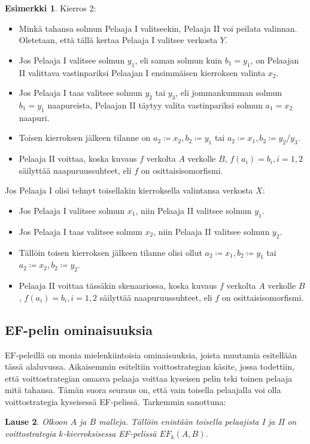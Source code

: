 \documentclass[finnish]{tktltiki2}
\newtheorem{lau}{Lause}
\theoremstyle{definition}
\newtheorem{esim}[lau]{Esimerkki}
\theoremstyle{remark}
\begin{document}
\begin{esim}
Kierros 2:
\begin{itemize}
  \item Minkä tahansa solmun Pelaaja I valitseekin, Pelaaja II voi peilata valinnan. Oletetaan, että tällä kertaa Pelaaja I valitsee verkosta $Y$.
  \item Jos Pelaaja I valitsee solmun $y_1$, eli saman solmun kuin $b_1 = y_1$, on Pelaajan II valittava vastinpariksi Pelaajan I ensimmäisen kierroksen valinta $x_2$.
  \item Jos Pelaaja I taas valitsee solmun $y_2$ tai $y_3$, eli jommankumman solmun $b_1 = y_1$ naapureista, Pelaajan II täytyy valita vastinpariksi solmun $a_1 = x_2$ naapuri.
  \item Toisen kierroksen jälkeen tilanne on $a_2 \coloneqq x_2, b_2 \coloneqq y_1$ tai $a_2 \coloneqq x_1, b_2 \coloneqq y_2/y_3$.
  \item Pelaaja II voittaa, koska kuvaus $f$ verkolta $A$ verkolle $B$, $f(a_i) = b_i, i = 1, 2$ säilyttää naapuruussuhteet, eli $f$ on osittaisisomorfismi.
\end{itemize}

Jos Pelaaja I olisi tehnyt toisellakin kierroksella valintansa verkosta $X$:
\begin{itemize}
\item Jos Pelaaja I valitsee solmun $x_1$, niin Pelaaja II valitsee solmun $y_1$.
\item Jos Pelaaja I taas valitsee solmun $x_2$, niin Pelaaja II valitsee solmun $y_2$.
\item Tällöin toisen kierroksen jälkeen tilanne olisi ollut $a_2 \coloneqq x_1, b_2 \coloneqq y_1$ tai $a_2 \coloneqq x_2, b_2 \coloneqq y_2$.
\item Pelaaja II voittaa tässäkin skenaariossa, koska kuvaus $f$ verkolta $A$ verkolle $B$, $f(a_i) = b_i, i = 1, 2$ säilyttää naapuruussuhteet, eli $f$ on osittaisisomorfismi.
\end{itemize}
\end{esim}

\subsection{EF-pelin ominaisuuksia}
EF-peleillä on monia mielenkiintoisia ominaisuuksia, joista muutamia esitellään tässä alaluvussa. Aikaisemmin esiteltiin voittostrategian käsite, jossa todettiin, että voittostrategian omaava pelaaja voittaa kyseisen pelin teki toinen pelaaja mitä tahansa. Tämän suora seuraus on, että vain toisella pelaajalla voi olla voittostrategia kyseisessä EF-pelissä. Tarkemmin sanottuna:
\begin{lau}
Olkoon $A$ ja $B$ malleja. Tällöin enintään toisella pelaajista I ja II on voittostrategia $k$-kierroksisessa EF-pelissä $EF_k(A, B)$.
\end{lau}
\end{document}
